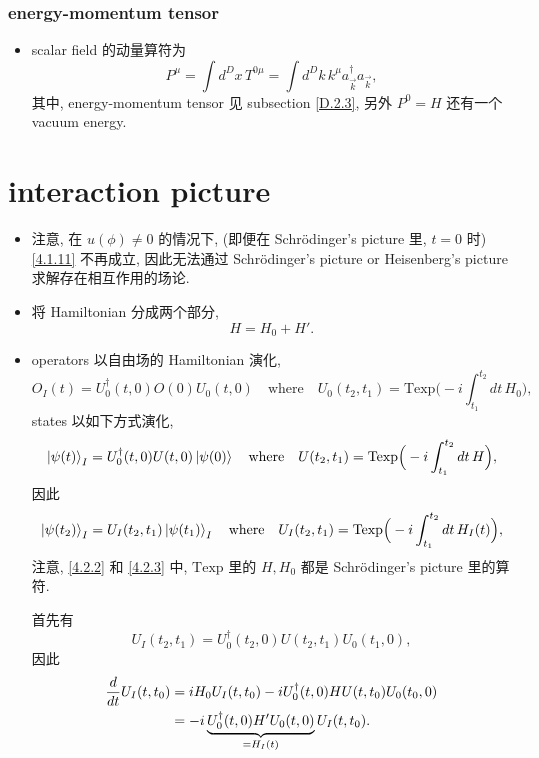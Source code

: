 \subsubsection{energy-momentum tensor}
\begin{itemize}
	\item scalar field 的动量算符为
	\begin{equation}
		P^\mu = \int d^D x \, T^{0 \mu} = \int d^D k \, k^\mu a^\dag_{\vec{k}} a_{\vec{k}},
	\end{equation}
	其中, energy-momentum tensor 见 subsection \ref{D.2.3}, 另外 $P^0 = H$ 还有一个 vacuum energy.
\end{itemize}

\section{interaction picture}
\begin{itemize}
	\item 注意, 在 $u(\phi) \neq 0$ 的情况下, (即便在 Schrödinger's picture 里, $t = 0$ 时) \eqref{4.1.11} 不再成立, 因此无法通过 Schrödinger's picture or Heisenberg's picture 求解存在相互作用的场论.
	
	\item 将 Hamiltonian 分成两个部分,
	\begin{equation}
		H = H_0 + H'.
	\end{equation}
	
	\item operators 以自由场的 Hamiltonian 演化,
	\begin{equation} \label{4.2.2}
		O_I(t) = U_0^\dag(t, 0) O(0) U_0(t, 0) \quad \text{where} \quad U_0(t_2, t_1) = \mathrm{Texp} \Big( - i \int_{t_1}^{t_2} dt \, H_0 \Big),
	\end{equation}
	states 以如下方式演化,
	\begin{equation} \label{4.2.3}
		\ket{\psi(t)}_I = U_0^\dag(t, 0) U(t, 0) \ket{\psi(0)} \quad \text{where} \quad U(t_2, t_1) = \mathrm{Texp} \Big( - i \int_{t_1}^{t_2} dt \, H \Big),
	\end{equation}
	因此
	\begin{equation}
		\ket{\psi(t_2)}_I = U_I(t_2, t_1) \ket{\psi(t_1)}_I \quad \text{where} \quad U_I(t_2, t_1) = \mathrm{Texp} \Big( - i \int_{t_1}^{t_2} dt \, H_I(t) \Big),
	\end{equation}
	注意, \eqref{4.2.2} 和 \eqref{4.2.3} 中, $\mathrm{Texp}$ 里的 $H, H_0$ 都是 Schrödinger's picture 里的算符.
	
	\begin{tcolorbox}[title=calculation:]
		首先有
		\begin{equation}
			U_I(t_2, t_1) = U_0^\dag(t_2, 0) U(t_2, t_1) U_0(t_1, 0),
		\end{equation}
		因此
		\begin{align}
			\frac{d}{dt} U_I(t, t_0) &= i H_0 U_I(t, t_0) - i U_0^\dag(t, 0) H U(t, t_0) U_0(t_0, 0) \notag \\
			&= - i \underbrace{U_0^\dag(t, 0) H' U_0(t, 0)}_{= H_I(t)} U_I(t, t_0).
		\end{align}
	\end{tcolorbox}
\end{itemize}

